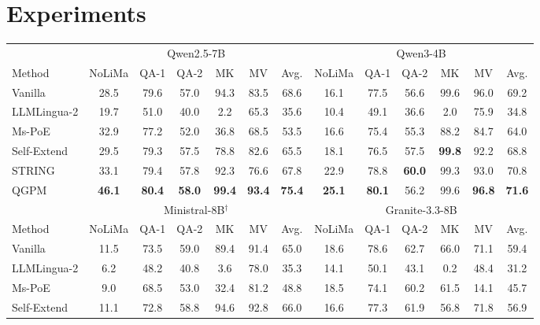 \documentclass[11pt]{article}
\begin{document}
\section{Experiments}
\label{sec:experiments}

\begin{table}[t]
\centering
\small
\setlength{\tabcolsep}{3pt}
\begin{tabular*}{\textwidth}{@{\extracolsep{\fill}} l cccccc @{\hspace{12pt}} cccccc @{}}
\toprule
 & \multicolumn{6}{c}{Qwen2.5-7B} & \multicolumn{6}{c}{Qwen3-4B} \\
\cmidrule(lr){2-7} \cmidrule(l){8-13}
Method & NoLiMa & QA-1 & QA-2 & MK & MV & Avg. & NoLiMa & QA-1 & QA-2 & MK & MV & Avg. \\
\midrule
Vanilla & 28.5 & 79.6 & 57.0 & 94.3 & 83.5 & 68.6 & 16.1 & 77.5 & 56.6 & 99.6 & 96.0 & 69.2 \\
LLMLingua-2 & 19.7 & 51.0 & 40.0 & \phantom{0}2.2 & 65.3 & 35.6 & 10.4 & 49.1 & 36.6 & \phantom{0}2.0 & 75.9 & 34.8 \\
Ms-PoE & 32.9 & 77.2 & 52.0 & 36.8 & 68.5 & 53.5 & 16.6 & 75.4 & 55.3 & 88.2 & 84.7 & 64.0 \\
Self-Extend & 29.5 & 79.3 & 57.5 & 78.8 & 82.6 & 65.5 & 18.1 & 76.5 & 57.5 & \textbf{99.8} & 92.2 & 68.8 \\
STRING & 33.1 & 79.4 & 57.8 & 92.3 & 76.6 & 67.8 & 22.9 & 78.8 & \textbf{60.0} & 99.3 & 93.0 & 70.8 \\
\midrule
QGPM & \textbf{46.1} & \textbf{80.4} & \textbf{58.0} & \textbf{99.4} & \textbf{93.4} & \textbf{75.4} & \textbf{25.1} & \textbf{80.1} & 56.2 & 99.6 & \textbf{96.8} & \textbf{71.6} \\
\midrule[\heavyrulewidth]
\addlinespace[2pt]
 & \multicolumn{6}{c}{Ministral-8B$^{\dagger}$} & \multicolumn{6}{c}{Granite-3.3-8B} \\
\cmidrule(lr){2-7} \cmidrule(l){8-13}
Method & NoLiMa & QA-1 & QA-2 & MK & MV & Avg. & NoLiMa & QA-1 & QA-2 & MK & MV & Avg. \\
\midrule
Vanilla & 11.5 & 73.5 & 59.0 & 89.4 & 91.4 & 65.0 & 18.6 & 78.6 & 62.7 & 66.0 & 71.1 & 59.4 \\
LLMLingua-2 & \phantom{0}6.2 & 48.2 & 40.8 & \phantom{0}3.6 & 78.0 & 35.3 & 14.1 & 50.1 & 43.1 & \phantom{0}0.2 & 48.4 & 31.2 \\
Ms-PoE & \phantom{0}9.0 & 68.5 & 53.0 & 32.4 & 81.2 & 48.8 & 18.5 & 74.1 & 60.2 & 61.5 & 14.1 & 45.7 \\
Self-Extend & 11.1 & 72.8 & 58.8 & 94.6 & 92.8 & 66.0 & 16.6 & 77.3 & 61.9 & 56.8 & 71.8 & 56.9 \\

\end{tabular*}
\end{table}
\end{document}
